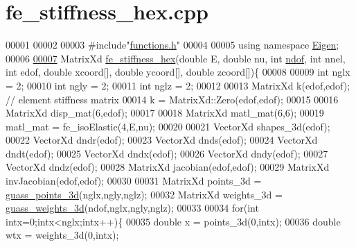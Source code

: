 \hypertarget{fe__stiffness__hex_8cpp_source}{}\section{fe\+\_\+stiffness\+\_\+hex.\+cpp}
\label{fe__stiffness__hex_8cpp_source}

\begin{DoxyCode}
00001 
00002 
00003 \textcolor{preprocessor}{#include"\hyperlink{functions_8h}{functions.h}"}
00004 
00005 \textcolor{keyword}{using namespace }\hyperlink{namespace_eigen}{Eigen};
00006 
\hyperlink{fe__stiffness__hex_8cpp_a9378d4fc517465015411134456235a76}{00007} MatrixXd \hyperlink{fe__stiffness__hex_8cpp_a9378d4fc517465015411134456235a76}{fe\_stiffness\_hex}(\textcolor{keywordtype}{double} E, \textcolor{keywordtype}{double} nu, \textcolor{keywordtype}{int} \hyperlink{_global_variables_8h_aa789fe4d8a13fd0990b630909430d5d0}{ndof}, \textcolor{keywordtype}{int} nnel, \textcolor{keywordtype}{int} edof, \textcolor{keywordtype}{double} 
      xcoord[], \textcolor{keywordtype}{double} ycoord[], \textcolor{keywordtype}{double} zcoord[])\{
00008 
00009     \textcolor{keywordtype}{int} nglx = 2;
00010     \textcolor{keywordtype}{int} ngly = 2;
00011     \textcolor{keywordtype}{int} nglz = 2;
00012 
00013     MatrixXd k(edof,edof); \textcolor{comment}{// element stiffness matrix  }
00014     k = MatrixXd::Zero(edof,edof);
00015 
00016     MatrixXd disp\_mat(6,edof);
00017 
00018     MatrixXd matl\_mat(6,6);
00019     matl\_mat = fe\_isoElastic(4,E,nu);
00020 
00021     VectorXd shapes\_3d(edof);
00022     VectorXd dndr(edof);    
00023     VectorXd dnds(edof);
00024     VectorXd dndt(edof);
00025     VectorXd dndx(edof);    
00026     VectorXd dndy(edof);
00027     VectorXd dndz(edof);
00028     MatrixXd jacobian(edof,edof);
00029     MatrixXd invJacobian(edof,edof);
00030 
00031     MatrixXd points\_3d = \hyperlink{functions_8h_a502e3469e1cc253deb142f46c0789a78}{guass\_points\_3d}(nglx,ngly,nglz);
00032     MatrixXd weights\_3d = \hyperlink{functions_8h_ad99b08ce65ae353e91486d7685c22024}{guass\_weights\_3d}(ndof,nglx,ngly,nglz);
00033 
00034     \textcolor{keywordflow}{for}(\textcolor{keywordtype}{int} intx=0;intx<nglx;intx++)\{
00035         \textcolor{keywordtype}{double} x = points\_3d(0,intx);
00036         \textcolor{keywordtype}{double} wtx = weights\_3d(0,intx);

\end{DoxyCode}
